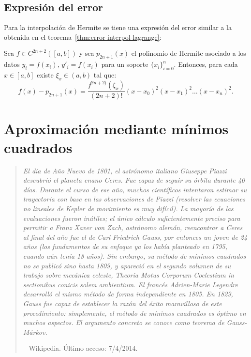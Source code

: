\subsection*{Expresión del error}
\label{sec:expresion-del-error-hermite}

Para la interpolación de Hermite se tiene una expresión del error
similar a la obtenida en el teorema~\ref{thm:error-interpol-lagrange}:
\begin{theorem}
  Sea $f\in C^{2n+2}([a,b])$ y sea $p_{2n+1}(x)$ el polinomio de
  Hermite asociado a los datos $y_i=f(x_i)$, $y'_i=f(x_i)$ para un
  soporte $\{x_i\}_{i=0}^n$. Entonces, para cada $x\in [a,b]$ existe
  $\xi_x\in (a,b)$ tal que:
  \begin{equation*}
    f(x)-p_{2n+1}(x)=\frac{f^{2n+2)}(\xi_x)}{(2n+2)!} (x-x_0)^2(x-x_1)^2\dots(x-x_n)^2.
  \end{equation*}
\end{theorem}

\section{Aproximación mediante mínimos cuadrados}
\label{sec:minimos-cuadrados}

\begin{quotation}
  \it\tiny El día de Año Nuevo de 1801, el astrónomo italiano Giuseppe
  Piazzi descubrió el planeta enano Ceres. Fue capaz de seguir su
  órbita durante 40 días. Durante el curso de ese año, muchos
  científicos intentaron estimar su trayectoria con base en las
  observaciones de Piazzi (resolver las ecuaciones no lineales de
  Kepler de movimiento es muy difícil). La mayoría de las evaluaciones
  fueron inútiles; el único cálculo suficientemente preciso para
  permitir a Franz Xaver von Zach, astrónomo alemán, reencontrar a
  Ceres al final del año fue el de Carl Friedrich Gauss, por entonces
  un joven de 24 años (los fundamentos de su enfoque ya los había
  planteado en 1795, cuando aún tenía 18 años). Sin embargo, su método
  de mínimos cuadrados no se publicó sino hasta 1809, y apareció en el
  segundo volumen de su trabajo sobre mecánica celeste, Theoria Motus
  Corporum Coelestium in sectionibus conicis solem ambientium. El
  francés Adrien-Marie Legendre desarrolló el mismo método de forma
  independiente en 1805.  En 1829, Gauss fue capaz de establecer la
  razón del éxito maravilloso de este procedimiento: simplemente, el
  método de mínimos cuadrados es óptimo en muchos aspectos. El
  argumento concreto se conoce como teorema de Gauss-Márkov.
  \par\hfill
    -- Wikipedia. Último acceso: 7/4/2014.
\end{quotation}

